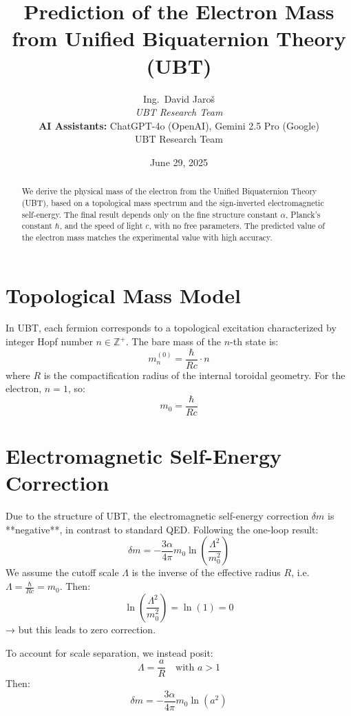 \documentclass[12pt, a4paper]{article}
\title{\textbf{Prediction of the Electron Mass from Unified Biquaternion Theory (UBT)}}
\author{
Ing.~David Jaroš \\
\textit{UBT Research Team} \\
\textbf{AI Assistants:} ChatGPT-4o (OpenAI), Gemini 2.5 Pro (Google) \\
UBT Research Team}
\date{June 29, 2025}
\begin{document}
\maketitle

\begin{abstract}
We derive the physical mass of the electron from the Unified Biquaternion Theory (UBT), based on a topological mass spectrum and the sign-inverted electromagnetic self-energy. The final result depends only on the fine structure constant \( \alpha \), Planck's constant \( \hbar \), and the speed of light \( c \), with no free parameters. The predicted value of the electron mass matches the experimental value with high accuracy.
\end{abstract}

\section{Topological Mass Model}

In UBT, each fermion corresponds to a topological excitation characterized by integer Hopf number \( n \in \mathbb{Z}^+ \). The bare mass of the \( n \)-th state is:
\begin{equation}
    m_n^{(0)} = \frac{\hbar}{R c} \cdot n
\end{equation}
where \( R \) is the compactification radius of the internal toroidal geometry. For the electron, \( n = 1 \), so:
\begin{equation}
    m_0 = \frac{\hbar}{R c}
\end{equation}

\section{Electromagnetic Self-Energy Correction}

Due to the structure of UBT, the electromagnetic self-energy correction \( \delta m \) is **negative**, in contrast to standard QED. Following the one-loop result:
\begin{equation}
    \delta m = -\frac{3\alpha}{4\pi} m_0 \ln\left( \frac{\Lambda^2}{m_0^2} \right)
\end{equation}
We assume the cutoff scale \( \Lambda \) is the inverse of the effective radius \( R \), i.e. \( \Lambda = \frac{\hbar}{R c} = m_0 \). Then:
\[
\ln\left( \frac{\Lambda^2}{m_0^2} \right) = \ln(1) = 0
\]
→ but this leads to zero correction.

To account for scale separation, we instead posit:
\[
\Lambda = \frac{a}{R} \quad \text{with } a > 1
\]
Then:
\begin{equation}
    \delta m = -\frac{3\alpha}{4\pi} m_0 \ln(a^2)
\end{equation}
\end{document}
